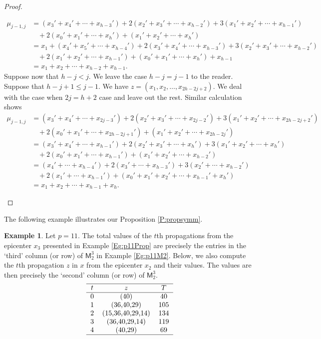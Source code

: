 \documentclass[12pt,reqno]{amsart}
\renewcommand{\leq}{\leqslant}
\newcommand{\M}{\mathsf{M}}
\theoremstyle{definition}
\newtheorem{eg}[thm]{Example}
\numberwithin{equation}{section}
\begin{document}
\begin{proof}
\begin{enumerate}[(i)]
\begin{align*}
            \mu_{j-1,j}&=(x_3'+x_4'+\cdots+x_{h-3}')+ 2(x_2'+x_3'+\cdots+x_{h-2}') + 3(x_1'+x_2'+\cdots+x_{h-1}')\\&\ \ \ \ 
            + 2(x_0'+x_1'+\cdots+x_{h}') + (x_1'+x_2'+\cdots+x_h')\\
            &=x_1+(x_4'+x_5'+\cdots+x_{h-4}')+ 2(x_3'+x_4'+\cdots+x_{h-3}') + 3(x_2'+x_3'+\cdots+x_{h-2}')\\&\ \ \ \ 
            + 2(x_1'+x_2'+\cdots+x_{h-1}') + (x_0'+x_1'+\cdots+x_h')+x_{h-1}\\
            &=x_1+x_2+\cdots+x_{h-2}+x_{h-1}.
          \end{align*} Suppose now that $h-j<j$. We leave the case $h-j=j-1$ to the reader. Suppose that $h-j+1\leq j-1$. We have $z=(x_1,x_2,\ldots,x_{2h-2j+2})$. We deal with the case when $2j=h+2$ case and leave out the rest. Similar calculation shows
          \begin{align*}
            \mu_{j-1,j}&=(x_3'+x_4'+\cdots+x_{2j-3}')+ 2(x_2'+x_3'+\cdots+x_{2j-2}') + 3(x_1'+x_2'+\cdots+x_{2h-2j+2}')
            \\&\ \ \ \   + 2(x_0'+x_1'+\cdots+x_{2h-2j+1}') + (x_1'+x_2'+\cdots+x_{2h-2j}')\\
            &=(x_3'+x_4'+\cdots+x_{h-1}')+ 2(x_2'+x_3'+\cdots+x_{h}') + 3(x_1'+x_2'+\cdots+x_{h}')
            \\&\ \ \ \   + 2(x_0'+x_1'+\cdots+x_{h-1}') + (x_1'+x_2'+\cdots+x_{h-2}')\\
            &=(x_4'+\cdots+x_{h-4}')+ 2(x_3'+\cdots+x_{h-3}') + 3(x_2'+\cdots+x_{h-2}')
            \\&\ \ \ \   + 2(x_1'+\cdots+x_{h-1}') + (x_0'+x_1'+x_2'+\cdots+x_{h-1}'+x_h')\\
            &=x_1+x_2+\cdots+x_{h-1}+x_{h}.
          \end{align*} 
      \end{enumerate}
\end{proof}

The following example illustrates our Proposition \ref{P:propsymm}.

\begin{eg}
  Let $p=11$. The total values of the $t$th propagations from the epicenter $x_3$ presented in Example \ref{Eg:p11Prop} are precisely the entries in the `third' column (or row) of $\M_2^3$ in Example \ref{Eg:p11M2}. Below, we also compute the $t$th propagation $z$ in $x$ from the epicenter $x_2$ and their values. The values are then precisely the `second' column (or row) of $\M_2^3$. 
  \[\begin{tabular}{ccc}
  \hline 
  $t$&$z$&$T$\\
  \hline 
  0&(40)&40\\
  1&(36,40,29)&105\\
  2&(15,36,40,29,14)&134\\
  3&(36,40,29,14)&119\\
  4&(40,29) &69\\
  \hline
\end{tabular}\]
\end{eg}
\end{document}

